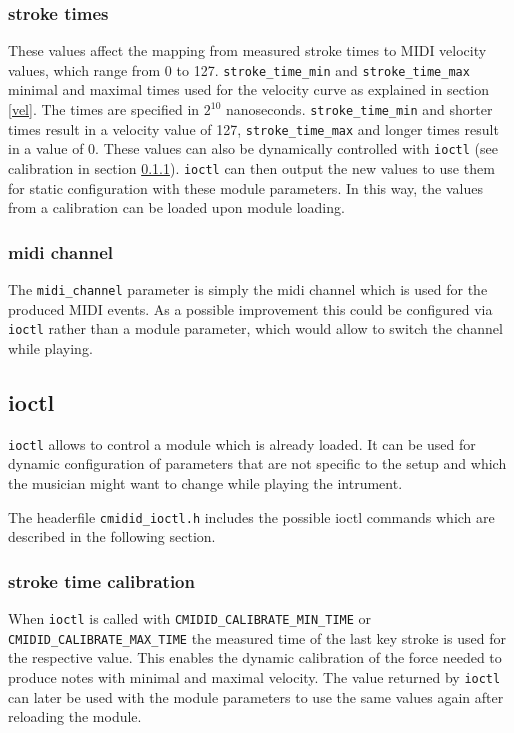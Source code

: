 \documentclass[paper=a4,fontsize=11pt,twocolumn,pagesize,bibtotoc]{scrartcl}
\begin{document}
\subsubsection{stroke times}
These values affect the mapping from measured stroke times to MIDI velocity values, which range from 0 to 127. \texttt{stroke\_time\_min} and \texttt{stroke\_time\_max} minimal and maximal times used for the velocity curve as explained in section \ref{vel}. The times are specified in $2^{10}$ nanoseconds. \texttt{stroke\_time\_min} and shorter times result in a velocity value of 127, \texttt{stroke\_time\_max} and longer times result in a value of 0. These values can also be dynamically controlled with \texttt{ioctl} (see calibration in section \ref{calib}). \texttt{ioctl} can then output the new values to use them for static configuration with these module parameters. In this way, the values from a calibration can be loaded upon module loading.

\subsubsection{midi channel}
The \texttt{midi\_channel} parameter is simply the midi channel which is used for the produced MIDI events. As a possible improvement this could be configured via \texttt{ioctl} rather than a module parameter, which would allow to switch the channel while playing.

\subsection{ioctl}
\texttt{ioctl} allows to control a module which is already loaded. It can be used for dynamic configuration of parameters that are not specific to the setup and which the musician might want to change while playing the intrument.

The headerfile \texttt{cmidid\_ioctl.h} includes the possible ioctl commands which are described in the following section.

\subsubsection{stroke time calibration}
\label{calib}
When \texttt{ioctl} is called with \texttt{CMIDID\_CALIBRATE\_MIN\_TIME} or \texttt{CMIDID\_CALIBRATE\_MAX\_TIME} the measured time of the last key stroke is used for the respective value. This enables the dynamic calibration of the force needed to produce notes with minimal and maximal velocity. The value returned by \texttt{ioctl} can later be used with the module parameters to use the same values again after reloading the module.
\end{document}
